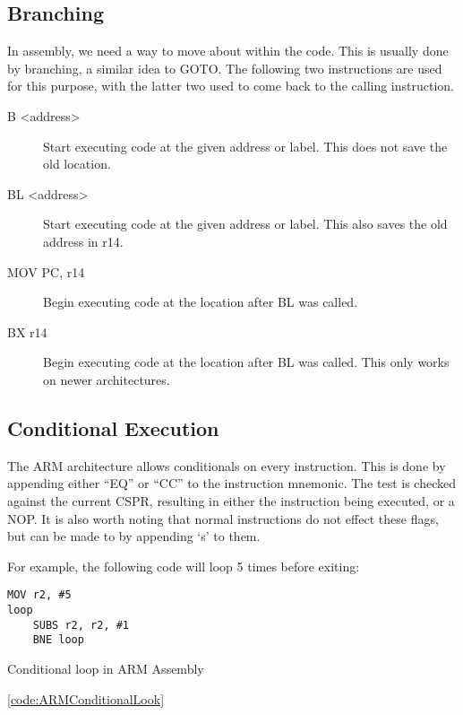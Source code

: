 			\subsection{Branching}
				In assembly, we need a way to move about within the code. 
				This is usually done by branching, a similar idea to GOTO. 
				The following two instructions are used for this purpose, with the latter two used to come back to the calling instruction. 
				\begin{description}
					\item[B <address>] Start executing code at the given address or label. 
						This does not save the old location. 
					\item[BL <address>] Start executing code at the given address or label. 
						This also saves the old address in r14. 
					\item[MOV PC, r14] Begin executing code at the location after BL was called. 
					\item[BX r14] Begin executing code at the location after BL was called. 
						This only works on newer architectures. 
				\end{description}

			\subsection{Conditional Execution}
				The ARM architecture allows conditionals on every instruction. 
				This is done by appending either ``EQ'' or ``CC'' to the instruction mnemonic. 
				The test is checked against the current CSPR, resulting in either the instruction being executed, or a NOP. 
				It is also worth noting that normal instructions do not effect these flags, but can be made to by appending `s' to them. 
				
				For example, the following code will loop 5 times before exiting:
				\begin{code}
					\begin{lstlisting}[language={[Motorola68k]assembler}]
	MOV r2, #5
loop
	SUBS r2, r2, #1
	BNE loop
					\end{lstlisting}
					\caption{Conditional loop in ARM Assembly}
					\ref{code:ARMConditionalLook}
				\end{code}

